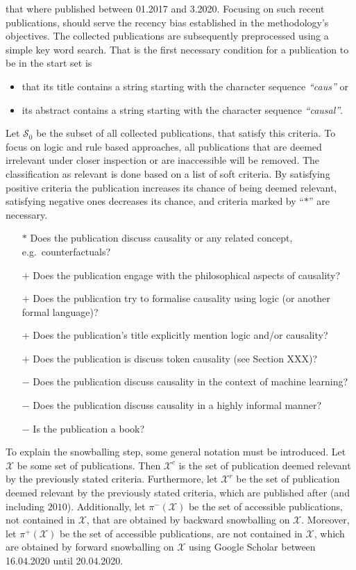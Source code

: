 \documentclass[11pt,a4paper]{book}
\theoremstyle{definition}
\theoremstyle{definition}
\theoremstyle{definition}
\theoremstyle{remark}
\newcommand{\xsetz}{\mathcal{S}_{\mathit{0}}}
\begin{document}
that where published between 01.2017 and 3.2020. Focusing on such recent publications, should serve the recency bias established in the methodology's objectives. 
The collected publications are subsequently preprocessed using a simple key word search. That is the first necessary condition for a publication to be in the start set is 
\begin{itemize}
\item  that its title contains a string starting with the character sequence \emph{``caus''} or 
\item  its abstract contains a string starting with the character sequence \emph{``causal''}. 
\end{itemize}
Let $\xsetz$ be the subset of all collected publications, that satisfy this criteria.
To focus on logic and rule based approaches, all publications that are deemed irrelevant under closer inspection or are inaccessible will be removed. The classification as relevant is done based on a list of soft criteria. By satisfying positive criteria the publication increases its chance of being deemed relevant, satisfying negative ones decreases its chance, and criteria marked by ``$\ast$'' are necessary.
\begin{itemize}
\item[$\ast$] Does the publication discuss causality or any related concept, e.g.\ counterfactuals? 
\item[$+$] Does the publication engage with the philosophical aspects of causality?
\item[$+$] Does the publication try to formalise causality using logic (or another formal language)?
\item[$+$] Does the publication's title explicitly mention logic and/or causality?
\item[$+$] Does the publication is discuss token causality (see Section XXX)?
\item[$-$] Does the publication discuss causality in the context of machine learning?
\item[$-$] Does the publication discuss causality in a highly informal manner?
\item[$-$] Is the publication a book?
\end{itemize}

To explain the snowballing step, some general notation must be introduced. Let $\mathcal{X}$ be some set of publications.
Then $\mathcal{X}^c$ is the set of publication deemed relevant by the previously stated criteria. Furthermore, let $\mathcal{X}^{r}$ be the set of publication deemed relevant by the previously stated criteria, which are published after (and including $2010$). 
Additionally, let $\pi^-(\mathcal{X})$ be the set of accessible publications, not contained in $\mathcal{X}$, that are obtained by backward snowballing on $\mathcal{X}$. Moreover, let $\pi^+(\mathcal{X})$ be the set of accessible publications, are not contained in $\mathcal{X}$, which are obtained by forward snowballing on $\mathcal{X}$ using Google Scholar between 16.04.2020 until 20.04.2020.
\end{document}
